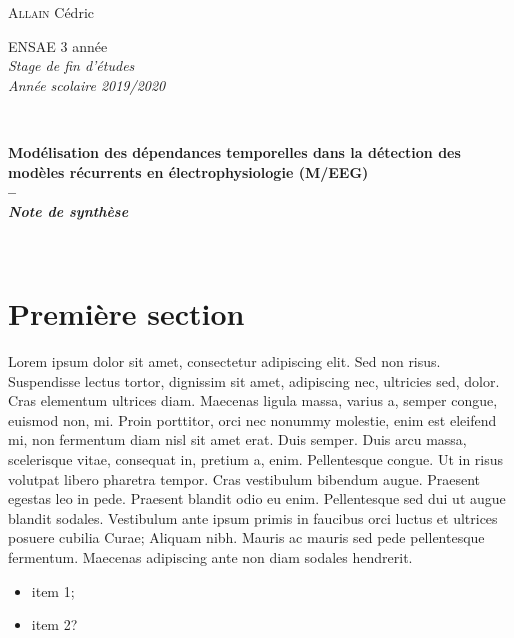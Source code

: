 \begin{minipage}{0.45\textwidth}
  \begin{flushleft} \Large
    \textsc{Allain} Cédric
  \end{flushleft}
\end{minipage}
\begin{minipage}{0.45\textwidth}
  \begin{flushright} \Large
    ENSAE 3 année\\
    \textit{Stage de fin d'études}\\
    \textit{Année scolaire 2019/2020}
  \end{flushright}
\end{minipage}
	
{\centering

\vspace{1.5cm}
\HRule \\[0.5cm]
{\huge\bfseries Modélisation des dépendances temporelles dans la détection des modèles récurrents en électrophysiologie (M/EEG) \\ -- \\ \textit{Note de synthèse} \par}
\bigskip
\HRule \\[0.5cm]
\vspace{0.5cm}
}

\setlength{\parskip}{5pt}

{}
\section*{Première section}
Lorem ipsum dolor sit amet, consectetur adipiscing elit. Sed non risus. Suspendisse lectus tortor, dignissim sit amet, adipiscing nec, ultricies sed, dolor. Cras elementum ultrices diam. Maecenas ligula massa, varius a, semper congue, euismod non, mi. Proin porttitor, orci nec nonummy molestie, enim est eleifend mi, non fermentum diam nisl sit amet erat. Duis semper. Duis arcu massa, scelerisque vitae, consequat in, pretium a, enim. Pellentesque congue. Ut in risus volutpat libero pharetra tempor. Cras vestibulum bibendum augue. Praesent egestas leo in pede. Praesent blandit odio eu enim. Pellentesque sed dui ut augue blandit sodales. Vestibulum ante ipsum primis in faucibus orci luctus et ultrices posuere cubilia Curae; Aliquam nibh. Mauris ac mauris sed pede pellentesque fermentum. Maecenas adipiscing ante non diam sodales hendrerit.

\begin{itemize}
    \item item 1;
    \item item 2?
\end{itemize}

